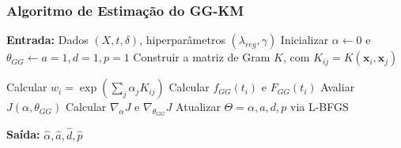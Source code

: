 \documentclass[aspectratio=169,t,xcolor=table]{beamer}
\begin{document}




\begin{frame}[fragile]
\frametitle{Algoritmo de Estimação do GG-KM}

\begin{algorithm}[H]
\caption{Processo de estimação do modelo GG-KM}
\begin{algorithmic}[1]
\State \textbf{Entrada:} Dados $(X,t,\delta)$, hiperparâmetros $(\lambda_{reg},\gamma)$
\State Inicializar $\alpha \leftarrow 0$ e $\theta_{GG} \leftarrow {a=1,d=1,p=1}$
\State Construir a matriz de Gram $K$, com $K_{ij}=K(\mathbf{x}_i,\mathbf{x}_j)$

\State Calcular $w_i=\exp\left(\sum_j\alpha_jK_{ij}\right)$
\State Calcular $f_{GG}(t_i)$ e $F_{GG}(t_i)$
\State Avaliar $J(\alpha,\theta_{GG})$
\State Calcular $\nabla_{\alpha}J$ e $\nabla_{\theta_{GG}}J$
\State Atualizar $\Theta={\alpha,a,d,p}$ via L-BFGS
\EndWhile

\State \textbf{Saída:} $\hat{\alpha},\hat{a},\hat{d},\hat{p}$
\end{algorithmic}
\end{algorithm}

\end{frame}





\end{document}
